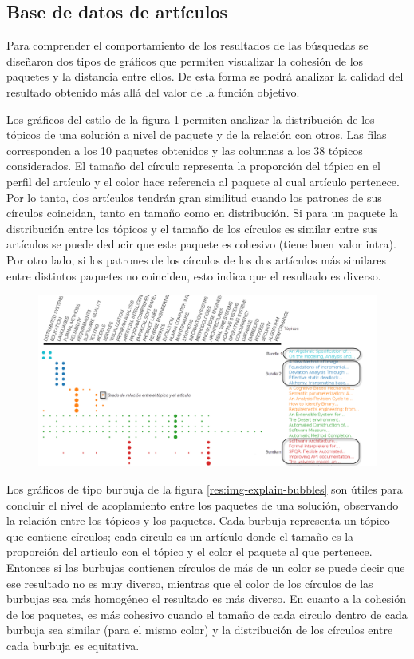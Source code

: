 \subsection{Base de datos de artículos}
Para comprender el comportamiento de los resultados de las búsquedas se diseñaron dos tipos de gráficos que permiten visualizar la cohesión de los paquetes y la distancia entre ellos. De esta forma se podrá analizar la calidad del resultado obtenido más allá del valor de la función objetivo.

Los gráficos del estilo de la figura \ref{res:img-explain-bars} permiten analizar la distribución de los tópicos de una solución a nivel de paquete y de la relación con otros. Las filas corresponden a los 10 paquetes obtenidos y las columnas a los 38 tópicos considerados. El tamaño del círculo representa la proporción del tópico en el perfil del artículo y el color hace referencia al paquete al cual artículo pertenece. Por lo tanto, dos artículos tendrán gran similitud cuando los patrones de sus círculos coincidan, tanto en tamaño como en distribución. Si para un paquete la distribución entre los tópicos y el tamaño de los círculos es similar entre sus artículos se puede deducir que este paquete es cohesivo (tiene buen valor intra). Por otro lado, si los patrones de los círculos de los dos artículos más similares entre distintos paquetes no coinciden, esto indica que el resultado es diverso.
\begin{figure}[H]
  \centering
    \includegraphics[width=1\textwidth]{img/explain-bars.png}
  \caption{}
  \label{res:img-explain-bars}
\end{figure}

Los gráficos de tipo burbuja de la figura \ref{res:img-explain-bubbles} son útiles para concluir el nivel de acoplamiento entre los paquetes de una solución, observando la relación entre los tópicos y los paquetes. Cada burbuja representa un tópico que contiene círculos; cada circulo es un artículo donde el tamaño es la proporción del articulo con el tópico y el color el paquete al que pertenece. Entonces si las burbujas contienen círculos de más de un color se puede decir que ese resultado no es muy diverso, mientras que el color de los círculos de las burbujas sea más homogéneo el resultado es más diverso. En cuanto a la cohesión de los paquetes, es más cohesivo cuando el tamaño de cada circulo dentro de cada burbuja sea similar (para el mismo color) y la distribución de los círculos entre cada burbuja es equitativa.

